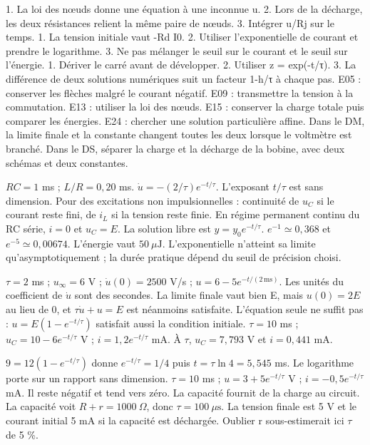 1. La loi des nœuds donne une équation à une inconnue u. 2. Lors de la décharge, les deux résistances relient la même paire de nœuds. 3. Intégrer u/Rj sur le temps.
1. La tension initiale vaut -Rd I0. 2. Utiliser l’exponentielle de courant et prendre le logarithme. 3. Ne pas mélanger le seuil sur le courant et le seuil sur l’énergie.
1. Dériver le carré avant de développer. 2. Utiliser z = exp(-t/τ). 3. La différence de deux solutions numériques suit un facteur 1-h/τ à chaque pas.
E05 : conserver les flèches malgré le courant négatif. E09 : transmettre la tension à la commutation. E13 : utiliser la loi des nœuds. E15 : conserver la charge totale puis comparer les énergies. E24 : chercher une solution particulière affine.
Dans le DM, la limite finale et la constante changent toutes les deux lorsque le voltmètre est branché. Dans le DS, séparer la charge et la décharge de la bobine, avec deux schémas et deux constantes.


$RC=1$ ms ; $L/R=0{,}20$ ms. $\dot u=-(2/\tau)e^{-t/\tau}$. L’exposant $t/\tau$ est sans dimension.
Pour des excitations non impulsionnelles : continuité de $u_C$ si le courant reste fini, de $i_L$ si la tension reste finie. En régime permanent continu du RC série, $i=0$ et $u_C=E$. La solution libre est $y=y_0e^{-t/\tau}$.
$e^{-1}\simeq0{,}368$ et $e^{-5}\simeq0{,}00674$. L’énergie vaut $50\ \mu\mathrm{ J}$. L’exponentielle n’atteint sa limite qu’asymptotiquement ; la durée pratique dépend du seuil de précision choisi.


$\tau=2$ ms ; $u_\infty=6$ V ; $\dot u(0)=2500$ V/s ; $u=6-5e^{-t/(2\,\mathrm{ms})}$. Les unités du coefficient de $\dot u$ sont des secondes.
La limite finale vaut bien E, mais $u(0)=2E$ au lieu de 0, et $\tau\dot u+u=E$ est néanmoins satisfaite. L’équation seule ne suffit pas : $u=E(1-e^{-t/\tau})$ satisfait aussi la condition initiale.
$\tau=10$ ms ; $u_C=10-6e^{-t/\tau}$ V ; $i=1{,}2e^{-t/\tau}$ mA. À $\tau$, $u_C=7{,}793$ V et $i=0{,}441$ mA.


$9=12(1-e^{-t/\tau})$ donne $e^{-t/\tau}=1/4$ puis $t=\tau\ln4=5{,}545$ ms. Le logarithme porte sur un rapport sans dimension.
$\tau=10$ ms ; $u=3+5e^{-t/\tau}$ V ; $i=-0{,}5e^{-t/\tau}$ mA. Il reste négatif et tend vers zéro. La capacité fournit de la charge au circuit.
La capacité voit $R+r=1000\ \Omega$, donc $\tau=100\ \mu\mathrm{ s}$. La tension finale est 5 V et le courant initial 5 mA si la capacité est déchargée. Oublier r sous-estimerait ici $\tau$ de 5 \%.


